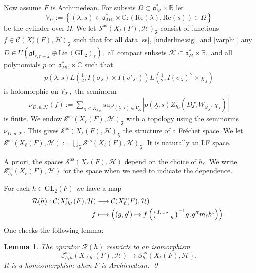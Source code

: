 \documentclass[12pt]{amsart}
\newtheorem{lem}[thm]{Lemma}
\theoremstyle{remark}
\numberwithin{equation}{section}
\newcommand{\GL}{\mathrm{GL}}
\newcommand{\lto}{\longrightarrow}
\newcommand{\CC}{\mathbb{C}}
\newcommand{\RR}{\mathbb{R}}
\newcommand{\GG}{\mathbb{G}}
\theoremstyle{definition}
\newenvironment{psmatrix}
  {\left(\begin{smallmatrix}}
  {\end{smallmatrix}\right)}
\numberwithin{equation}{subsection}
\begin{document}
Now assume $F$ is Archimedean. For subsets $\Omega \subset \mathfrak{a}_M^* \times \RR$ let $$
V_{\Omega}:=\left\{(\lambda,s) \in \mathfrak{a}_{M \CC}^* \times \CC: (\mathrm{Re}(\lambda),\mathrm{Re}(s)) \in \Omega\right\}
$$
be the cylinder over $\Omega.$
We let $\mathcal{S}^{\mathrm{as}}(X_{\ell}(F),\mathcal{H})_{\mathfrak{F}}$ consist of functions $f\in \mathcal{C}(X^{\circ}_{\ell}(F),\mathcal{H})_{\mathfrak{F}}$ such that for all data \eqref{ss}, \eqref{underline:sig}, and \eqref{varphi}, any $D\in U(\mathfrak{gl}_{r,r-2}  \oplus \mathrm{Lie}\,(\GL_2)_\ell),$  all compact subsets $\mathcal{K} \subset \mathfrak{a}_M^* \times \RR,$ and all polynomials $p$ on $\mathfrak{a}_{M\CC}^* \times \CC$ such that
\begin{align*}p(\underline{\lambda},s)L(\tfrac{1}{2},I(\sigma_\lambda) \times I(\sigma'_{\lambda'}))L(\tfrac{1}{2},I(\sigma_\lambda)^{\vee} \times \chi_s)
    \end{align*}
    is holomorphic on $V_{\mathcal{K}},$
the seminorm
    \begin{align*}
       \nu_{D,p,\mathcal{K}}(f):= \sum_{\chi\in \widehat{K}_{\GG_m}}\mathrm{sup}_{(\underline{\lambda},s) \in V_{\mathcal{K}}}\left|p(\underline{\lambda},s)Z_{h_\ell}(Df,W_{\underline{\varphi_{\lambda}}},\chi_s)\right|
\end{align*}
is finite.  
We endow $\mathcal{S}^{\mathrm{as}}(X_{\ell}(F),\mathcal{H})_{\mathfrak{F}}$ with a topology using the seminorms $\nu_{D,p,\mathcal{K}}.$  This gives $\mathcal{S}^{\mathrm{as}}(X_\ell(F),\mathcal{H})_{\mathfrak{F}}$ the structure of a Fr\'echet space.  We let $\mathcal{S}^{\mathrm{as}}(X_\ell(F),\mathcal{H}):=\bigcup_{\mathfrak{F}}\mathcal{S}^{\mathrm{as}}(X_\ell(F),\mathcal{H})_{\mathfrak{F}}.$  It is naturally an LF space. 

A priori, the spaces $\mathcal{S}^{\mathrm{as}}(X_\ell(F),\mathcal{H})$ depend on the choice of $h_\ell.$  We write $\mathcal{S}_{h_\ell}^{\mathrm{as}}(X_\ell(F),\mathcal{H})$ for the space when we need to indicate the dependence.  


For each $h \in \GL_2(F)$ we have a map
\begin{align} \label{Rh}
\begin{split}
\mathcal{R}(h):\mathcal{C}(X_{\ell h^{\iota}}^\circ(F),\mathcal{H}) &\lto \mathcal{C}(X_{\ell}^\circ(F),\mathcal{H})\\
f &\longmapsto \left((g,g') \mapsto f\left( \begin{psmatrix} I_{r-2} & \\ & h\end{psmatrix}^{-1}g,g'^tm_{\ell}h^{\iota} \right)\right).
\end{split}
\end{align}
One checks the following lemma:
\begin{lem} \label{lem:Rh}
The operator $\mathcal{R}(h)$ restricts to an isomorphism $$\mathcal{S}_{h_\ell h}^{\mathrm{as}}(X_{\ell h^{\iota}}(F),\mathcal{H}) \lto\mathcal{S}_{h_\ell }^{\mathrm{as}}(X_{\ell}(F),\mathcal{H}).$$ It is a homeomorphism when $F$ is Archimedean. \qed
\end{lem}
\end{document}
